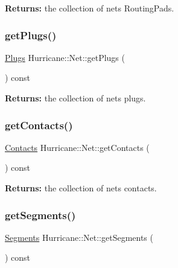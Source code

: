 {\bfseries Returns\+:} the collection of net\textquotesingle{}s Routing\+Pads. \mbox{\label{classHurricane_1_1Net_a88322672c105405a61a78022359178aa}} 
\subsubsection{\texorpdfstring{get\+Plugs()}{getPlugs()}}
{\footnotesize\ttfamily \mbox{\hyperlink{namespaceHurricane_ac8335d2057483ee7a935c15a9460c64f}{Plugs}} Hurricane\+::\+Net\+::get\+Plugs (\begin{DoxyParamCaption}{ }\end{DoxyParamCaption}) const}

{\bfseries Returns\+:} the collection of net\textquotesingle{}s plugs. \mbox{\label{classHurricane_1_1Net_a9c397596fe9ecbf674712c72e0b9010c}} 
\subsubsection{\texorpdfstring{get\+Contacts()}{getContacts()}}
{\footnotesize\ttfamily \mbox{\hyperlink{namespaceHurricane_a1e6a8ab09f688509bd727b3fee02d0d2}{Contacts}} Hurricane\+::\+Net\+::get\+Contacts (\begin{DoxyParamCaption}{ }\end{DoxyParamCaption}) const}

{\bfseries Returns\+:} the collection of net\textquotesingle{}s contacts. \mbox{\label{classHurricane_1_1Net_aadc5a9ef26d7a72f49fdf22452f3cc58}} 
\subsubsection{\texorpdfstring{get\+Segments()}{getSegments()}}
{\footnotesize\ttfamily \mbox{\hyperlink{namespaceHurricane_a30748fa53a81cb597d4a13d651238716}{Segments}} Hurricane\+::\+Net\+::get\+Segments (\begin{DoxyParamCaption}{ }\end{DoxyParamCaption}) const}

